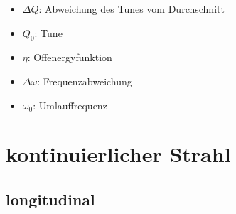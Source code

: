 \documentclass[12pt]{article}%
\begin{document}
\begin{itemize}
	\begin{itemize}
	
		\item $\Delta Q$: Abweichung des Tunes vom Durchschnitt
		\item $Q_0$: Tune
		\item $\eta$: Offenergyfunktion
		\item $\Delta \omega$: Frequenzabweichung
		\item $\omega_0$: Umlauffrequenz
	
	\end{itemize}

\end{itemize}

\section{kontinuierlicher Strahl}

\subsection{longitudinal}
\end{document}
